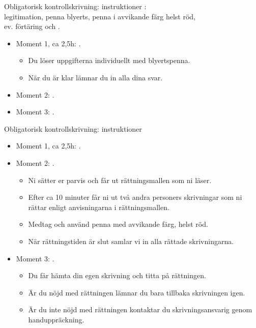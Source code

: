 \begin{Slide}{Obligatorisk kontrollskrivning: instruktioner}
: \\ legitimation, penna blyerts, penna i avvikande färg helst röd, \\ ev. förtäring och .

\vspace{2em}\begin{itemize}
\item Moment 1, ca 2,5h: .
\begin{itemize}
\item Du löser uppgifterna individuellt med blyertspenna.
\item När du är klar lämnar du in alla dina svar.
\end{itemize}
\item Moment  2: .
\item Moment 3: .
\end{itemize}
\end{Slide}

\begin{Slide}{Obligatorisk kontrollskrivning: instruktioner}
\begin{itemize}
\item Moment 1, ca 2,5h: .

\item Moment  2: .
\begin{itemize}

\item
Ni  sätter  er  parvis  och  får  ut  rättningsmallen  som  ni läser.

\item Efter  ca  10  minuter  får  ni  ut  två andra  personers  skrivningar  som  ni  rättar enligt  anvisningarna  i  rättningsmallen.

\item Medtag och använd penna med avvikande färg, helst röd.

\item När  rättningstiden  är  slut  samlar  vi in alla rättade skrivningarna.
\end{itemize}
\pause
\item Moment 3: .
\begin{itemize}
\item Du får hämta din egen skrivning och titta på rättningen.
\item Är  du  nöjd  med  rättningen  lämnar  du  bara tillbaka  skrivningen igen.
\item Är du inte nöjd med rättningen kontaktar du skrivningsansvarig genom handuppräckning.
\end{itemize}
\end{itemize}
\end{Slide}

